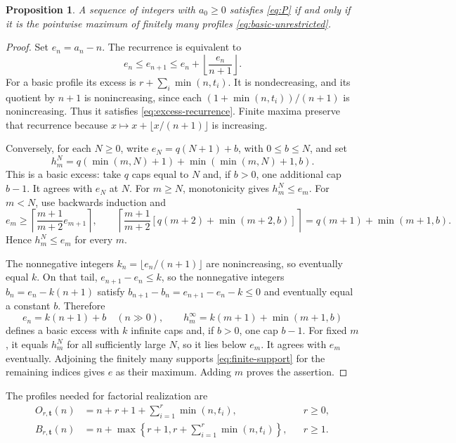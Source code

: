 \documentclass[11pt,reqno]{amsart}
\numberwithin{equation}{section}
\theoremstyle{plain}
\newtheorem{proposition}[theorem]{Proposition}
\theoremstyle{definition}
\theoremstyle{remark}
\begin{document}
\begin{proposition}\label{prop:envelope}
A sequence of integers with \(a_0\ge0\) satisfies \eqref{eq:P}
if and only if it is the pointwise maximum of finitely many
profiles \eqref{eq:basic-unrestricted}.
\end{proposition}
\begin{proof}
Set \(e_n=a_n-n\). The recurrence is equivalent to
\begin{equation}\label{eq:excess-recurrence}
 e_n\le e_{n+1}\le e_n+\left\lfloor\frac{e_n}{n+1}\right\rfloor.
\end{equation}
For a basic profile its excess is \(r+\sum_i\min(n,t_i)\).
It is nondecreasing, and its quotient by \(n+1\) is nonincreasing,
since each \((1+\min(n,t_i))/(n+1)\) is nonincreasing.
Thus it satisfies \eqref{eq:excess-recurrence}. Finite maxima
preserve that recurrence because
\(x\mapsto x+\lfloor x/(n+1)\rfloor\) is increasing.

Conversely, for each \(N\ge0\), write
\(e_N=q(N+1)+b\), with \(0\le b\le N\), and set
\begin{equation}\label{eq:finite-support}
 h^N_m=q(\min(m,N)+1)+\min(\min(m,N)+1,b).
\end{equation}
This is a basic excess: take \(q\) caps equal to \(N\) and,
if \(b>0\), one additional cap \(b-1\). It agrees with \(e_N\)
at \(N\). For \(m\ge N\), monotonicity gives \(h^N_m\le e_m\).
For \(m<N\), use backwards induction and
\[
 e_m\ge\left\lceil\frac{m+1}{m+2}e_{m+1}\right\rceil,
 \qquad
 \left\lceil\frac{m+1}{m+2}
 [q(m+2)+\min(m+2,b)]\right\rceil
 =q(m+1)+\min(m+1,b).
\]
Hence \(h^N_m\le e_m\) for every \(m\).

The nonnegative integers \(k_n=\lfloor e_n/(n+1)\rfloor\)
are nonincreasing, so eventually equal \(k\). On that tail,
\(e_{n+1}-e_n\le k\), so the nonnegative integers
\(b_n=e_n-k(n+1)\) satisfy
\(b_{n+1}-b_n=e_{n+1}-e_n-k\le0\) and eventually equal a
constant \(b\). Therefore
\[
 e_n=k(n+1)+b\quad(n\gg0),\qquad
 h^\infty_m=k(m+1)+\min(m+1,b)
\]
defines a basic excess with \(k\) infinite caps and, if \(b>0\),
one cap \(b-1\). For fixed \(m\), it equals \(h^N_m\) for all
sufficiently large \(N\), so it lies below \(e_m\). It agrees
with \(e_m\) eventually. Adjoining the finitely many supports
\eqref{eq:finite-support} for the remaining indices gives \(e\)
as their maximum. Adding \(m\) proves the assertion.
\end{proof}

The profiles needed for factorial realization are
\begin{align}
 O_{r,\mathbf t}(n)&=n+r+1+\sum_{i=1}^r\min(n,t_i),
 &&r\ge0,\label{eq:ordinary-profile}\\
 B_{r,\mathbf t}(n)&=n+\max\left\{r+1,
 r+\sum_{i=1}^r\min(n,t_i)\right\},
 &&r\ge1.\label{eq:delayed-profile}
\end{align}
\end{document}
